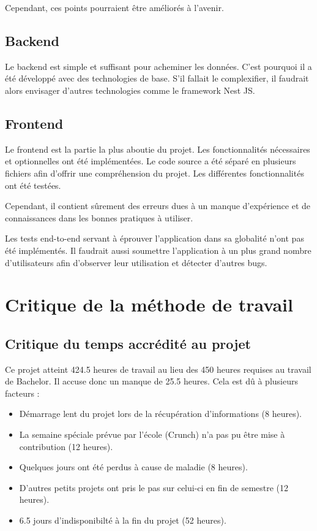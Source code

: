 \documentclass[
    iai, %
    il, %
]{heig-tb}
\begin{document}
Cependant, ces points pourraient être améliorés à l'avenir.

\subsection{Backend}
Le backend est simple et suffisant pour acheminer les données.
C'est pourquoi il a été développé avec des technologies de base.
S'il fallait le complexifier, il faudrait alors envisager d'autres technologies comme le framework Nest JS.

\subsection{Frontend}
Le frontend est la partie la plus aboutie du projet.
Les fonctionnalités nécessaires et optionnelles ont été implémentées.
Le code source a été séparé en plusieurs fichiers afin d'offrir une compréhension du projet.
Les différentes fonctionnalités ont été testées.

Cependant, il contient sûrement des erreurs dues à un manque d'expérience et de connaissances dans les bonnes pratiques à utiliser.

Les tests end-to-end servant à éprouver l'application dans sa globalité n'ont pas été implémentés.
Il faudrait aussi soumettre l'application à un plus grand nombre d'utilisateurs afin d'observer leur utilisation et détecter d'autres bugs.

\section{Critique de la méthode de travail}

\subsection{Critique du temps accrédité au projet}
Ce projet atteint 424.5 heures de travail au lieu des 450 heures requises au travail de Bachelor. Il accuse donc un manque de 25.5 heures.
Cela est dû à plusieurs facteurs :

\begin{itemize}
    \item Démarrage lent du projet lors de la récupération d'informations (8 heures).
    \item La semaine spéciale prévue par l'école (Crunch) n'a pas pu être mise à contribution (12 heures).
    \item Quelques jours ont été perdus à cause de maladie (8 heures).
    \item D'autres petits projets ont pris le pas sur celui-ci en fin de semestre (12 heures).
    \item 6.5 jours d'indisponibilté à la fin du projet (52 heures).
\end{itemize}
\end{document}

